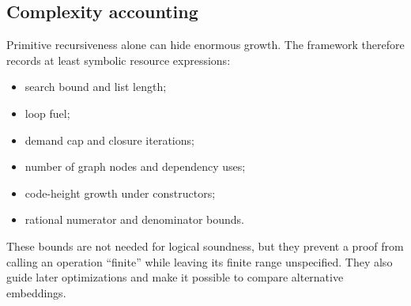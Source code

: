 \subsection{Complexity accounting}

Primitive recursiveness alone can hide enormous growth.  The framework therefore records at least symbolic
resource expressions:
\begin{itemize}
  \item search bound and list length;
  \item loop fuel;
  \item demand cap and closure iterations;
  \item number of graph nodes and dependency uses;
  \item code-height growth under constructors;
  \item rational numerator and denominator bounds.
\end{itemize}
These bounds are not needed for logical soundness, but they prevent a proof from calling an operation
``finite'' while leaving its finite range unspecified.  They also guide later optimizations and make it
possible to compare alternative embeddings.
